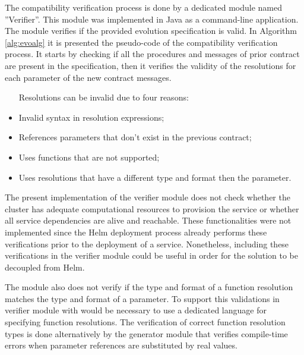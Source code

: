 The compatibility verification process is done by a dedicated module named ''Verifier''.
This module was implemented in Java as a command-line application.
The module verifies if the provided evolution specification is valid.
In Algorithm \ref{alg:evoalg} it is presented the pseudo-code of the compatibility verification process.
It starts by checking if all the procedures and messages of prior contract are present in the specification,
then it verifies the validity of the resolutions for each parameter of the new contract messages.
\begin{itemize}
    \setlength\itemsep{0em}
    \item [Resolutions can be invalid due to four reasons:]
    \item Invalid syntax in resolution expressions;
    \item References parameters that don't exist in the previous contract;
    \item Uses functions that are not supported;
    \item Uses resolutions that have a different type and format then the parameter.
\end{itemize}

The present implementation of the verifier module does not check whether the cluster has adequate computational resources to provision the service or whether all service dependencies are alive and reachable.
These functionalities were not implemented since the Helm deployment process already performs these verifications prior to the deployment of a service.
Nonetheless, including these verifications in the verifier module could be useful in order for the solution to be decoupled from Helm.

The module also does not verify if the type and format of a function resolution matches the type and format of a parameter.
To support this validations in verifier module with would be necessary to use a dedicated language for specifying function resolutions.
The verification of correct function resolution types is done alternatively by the generator module that verifies compile-time errors when parameter references are substituted by real values.

